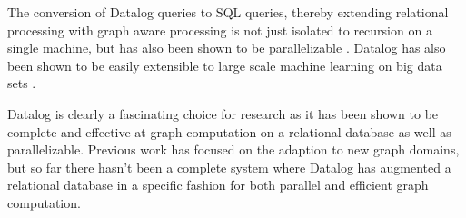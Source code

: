 \documentclass[11pt,letterpaper]{article}
\begin{document}
The conversion of Datalog queries to SQL queries, thereby extending relational processing with graph aware processing is not just isolated to recursion on a single machine, but has also been shown to be parallelizable \cite{seo_distributed_2013}. Datalog has also been shown to be easily extensible to large scale machine learning on big data sets \cite{bu_scaling_2012}.

Datalog is clearly a fascinating choice for research as it has been shown to be complete and effective at graph computation on a relational database as well as parallelizable. Previous work has focused on the adaption to new graph domains, but so far there hasn't been a complete system where Datalog has augmented a relational database in a specific fashion for both parallel and efficient graph computation.

%
%
%
%
\end{document}
